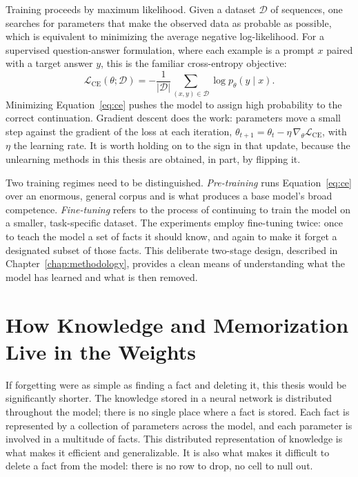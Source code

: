 \documentclass[a4paper,12pt]{report}
\begin{document}
Training proceeds by maximum likelihood. Given a dataset $\mathcal{D}$ of sequences, one searches for parameters that make the observed data as probable as possible, which is equivalent to minimizing the average negative log-likelihood. For a supervised question-answer formulation, where each example is a prompt $x$ paired with a target answer $y$, this is the familiar cross-entropy objective:
\begin{equation}
	\mathcal{L}_{\mathrm{CE}}(\theta; \mathcal{D}) = -\frac{1}{|\mathcal{D}|} \sum_{(x,y)\in\mathcal{D}} \log p_\theta\!\left(y \mid x\right).
	\label{eq:ce}
\end{equation}
Minimizing Equation~\eqref{eq:ce} pushes the model to assign high probability to the correct continuation. Gradient descent does the work: parameters move a small step against the gradient of the loss at each iteration, $\theta_{t+1} = \theta_t - \eta\,\nabla_\theta \mathcal{L}_{\mathrm{CE}}$, with $\eta$ the learning rate. It is worth holding on to the sign in that update, because the unlearning methods in this thesis are obtained, in part, by flipping it.

Two training regimes need to be distinguished. \emph{Pre-training} runs Equation~\eqref{eq:ce} over an enormous, general corpus and is what produces a base model's broad competence. \emph{Fine-tuning} refers to the process of continuing to train the model on a smaller, task-specific dataset. The experiments employ fine-tuning twice: once to teach the model a set of facts it should know, and again to make it forget a designated subset of those facts. This deliberate two-stage design, described in Chapter~\ref{chap:methodology}, provides a clean means of understanding what the model has learned and what is then removed.

\section{How Knowledge and Memorization Live in the Weights}
If forgetting were as simple as finding a fact and deleting it, this thesis would be significantly shorter. The knowledge stored in a neural network is distributed throughout the model; there is no single place where a fact is stored. Each fact is represented by a collection of parameters across the model, and each parameter is involved in a multitude of facts. This distributed representation of knowledge is what makes it efficient and generalizable. It is also what makes it difficult to delete a fact from the model: there is no row to drop, no cell to null out.
\end{document}
